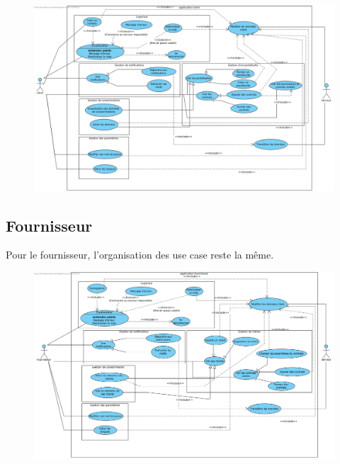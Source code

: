 \begin{figure}[h]
\centering
\includegraphics[width = 1\textwidth]{use_case/client.png}
\end{figure}

\subsection{Fournisseur}
	Pour le fournisseur, l'organisation des use case reste la même. 
	
\begin{figure}[h]
\centering
\includegraphics[width = 1\textwidth]{use_case/fournisseur.png}
\end{figure}